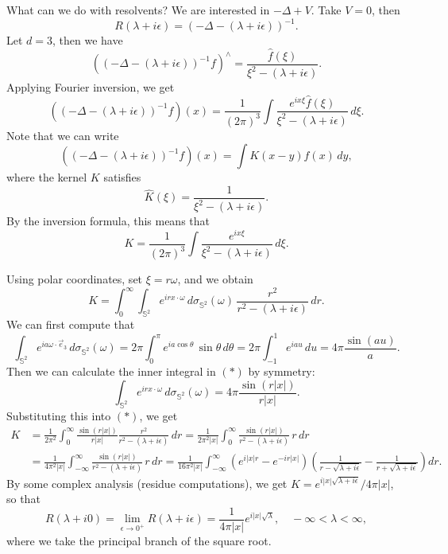 \begin{remark}
  What can we do with resolvents? We are interested
  in $- \Delta + V$. Take $V = 0$, then
  \[
    R(\lambda + i\epsilon)
    = (-\Delta - (\lambda + i\epsilon))^{-1}.
  \]
  Let $d = 3$, then we have
  \[
    ((-\Delta - (\lambda + i\epsilon))^{-1} f)^\wedge
    = \frac{\widehat{f}(\xi)}{\xi^2 - (\lambda + i\epsilon)}.
  \]
  Applying Fourier inversion, we get
  \[
    ((-\Delta - (\lambda + i\epsilon))^{-1} f)(x)
    = \frac{1}{(2\pi)^3} \int \frac{e^{ix\xi} \widehat{f}(\xi)}{\xi^2 - (\lambda + i\epsilon)}\, d\xi.
  \]
  Note that we can write
  \[
    ((-\Delta - (\lambda + i\epsilon))^{-1} f)(x)
    = \int K(x - y) f(x)\, dy,
  \]
  where the kernel $K$ satisfies
  \[
    \widehat{K}(\xi) =
    \frac{1}{\xi^2 - (\lambda + i\epsilon)}.
  \]
  By the inversion formula, this means that
  \[
    K = \frac{1}{(2\pi)^3} \int \frac{e^{ix\xi}}{\xi^2 - (\lambda + i\epsilon)}\, d\xi.
  \]

  Using polar coordinates, set $\xi = r \omega$, and
  we obtain
  \[
    K
    = \int_0^\infty \int_{\mathbb{S}^2} e^{i r x \cdot \omega}\, d \sigma_{\mathbb{S}^2}(\omega)\,
    \frac{r^2}{r^2 - (\lambda + i\epsilon)}\, dr. \tag{$*$}
  \]
  We can first compute that
  \[
    \int_{\mathbb{S}^2} e^{ia \omega \cdot \vec{e}_3}\, d \sigma_{\mathbb{S}^2}(\omega)
    = 2\pi \int_0^\pi e^{ia \cos \theta}\, \sin \theta\, d\theta
    = 2\pi \int_{-1}^1 e^{ia u}\, du
    = 4\pi \frac{\sin(au)}{a}.
  \]
  Then we can calculate the inner integral in
  $(*)$ by symmetry:
  \[
    \int_{\mathbb{S}^2} e^{i r x \cdot \omega}\, d \sigma_{\mathbb{S}^2}(\omega)
    = 4\pi \frac{\sin(r |x|)}{r |x|}.
  \]
  Substituting this into $(*)$, we get
  \begin{align*}
    K
    &= \frac{1}{2\pi^2} \int_0^\infty \frac{\sin(r |x|)}{r |x|} \frac{r^2}{r^2 - (\lambda + i\epsilon)}\, dr
    = \frac{1}{2\pi^2 |x|} \int_0^\infty \frac{\sin(r |x|)}{r^2 - (\lambda + i \epsilon)}\, r\, dr \\
    &= \frac{1}{4\pi^2 |x|} \int_{-\infty}^\infty \frac{\sin(r |x|)}{r^2 - (\lambda + i \epsilon)}\, r\, dr
    = \frac{1}{16 \pi^2 |x|} \int_{-\infty}^\infty
    (e^{i|x|r} - e^{-ir|x|}) \left(\frac{1}{r - \sqrt{\lambda + i\epsilon}} - \frac{1}{r + \sqrt{\lambda + i\epsilon}}\right) dr.
  \end{align*}
  By some complex analysis (residue computations),
  we get
  $K = e^{i|x| \sqrt{\lambda + i\epsilon}} / 4\pi |x|$,
  so that
  \[
    R(\lambda + i 0) = \lim_{\epsilon \to 0^+} R(\lambda + i\epsilon)
    = \frac{1}{4\pi |x|} e^{i|x| \sqrt{\lambda}},
    \quad -\infty < \lambda < \infty,
  \]
  where we take the principal branch of the square root.
\end{remark}

